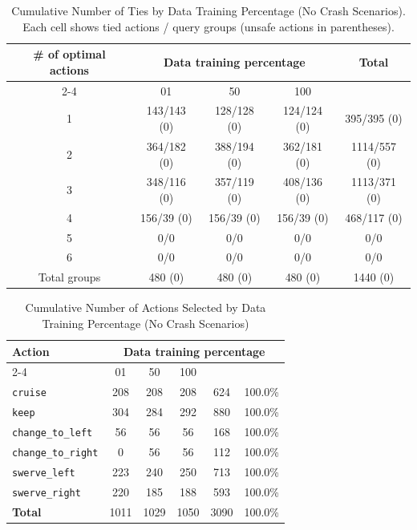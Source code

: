 \documentclass{article}
\begin{document}
\begin{table}[h]
\centering
\caption{Cumulative Number of Ties by Data Training Percentage (No Crash Scenarios).
Each cell shows tied actions / query groups (unsafe actions in parentheses).}
\begin{tabular}{c|ccc|c}
\toprule
\multirow{2}{*}{\# of optimal actions} & \multicolumn{3}{c|}{Data training percentage} & \multirow{2}{*}{Total} \\
\cmidrule{2-4}
 & 01 & 50 & 100 & \\
\midrule
1 & 143/143 (0) & 128/128 (0) & 124/124 (0) & 395/395 (0) \\ 
2 & 364/182 (0) & 388/194 (0) & 362/181 (0) & 1114/557 (0) \\ 
3 & 348/116 (0) & 357/119 (0) & 408/136 (0) & 1113/371 (0) \\ 
4 & 156/39 (0) & 156/39 (0) & 156/39 (0) & 468/117 (0) \\ 
5 & 0/0 & 0/0 & 0/0 & 0/0 \\ 
6 & 0/0 & 0/0 & 0/0 & 0/0 \\ 
\midrule
Total groups & 480 (0) & 480 (0) & 480 (0) & 1440 (0) \\ 
\bottomrule
\end{tabular}
\end{table}

\begin{table}[h]
\centering
\caption{Cumulative Number of Actions Selected by Data Training Percentage (No Crash Scenarios)}
\begin{tabular}{l|ccc|c|c}
\toprule
\multirow{2}{*}{Action} & \multicolumn{5}{c|}{Data training percentage} & \multirow{2}{*}{Total} & \multirow{2}{*}{Safe (\%)} \\
\cmidrule{2-4}
 & 01 & 50  & 100 & & \\
\midrule
\texttt{cruise} & 208 & 208 & 208 & 624 & 100.0\% \\ 
\texttt{keep} & 304 & 284 & 292 & 880 & 100.0\% \\ 
\texttt{change\_to\_left} & 56 & 56 & 56 & 168 & 100.0\% \\ 
\texttt{change\_to\_right} & 0 & 56 & 56 & 112 & 100.0\% \\ 
\texttt{swerve\_left} & 223 & 240 & 250 & 713 & 100.0\% \\ 
\texttt{swerve\_right} & 220 & 185 & 188 & 593 & 100.0\% \\ 
\midrule
\textbf{Total} & 1011 & 1029 & 1050 & 3090 & 100.0\% \\ 
\bottomrule
\end{tabular}
\end{table}
\end{document}
